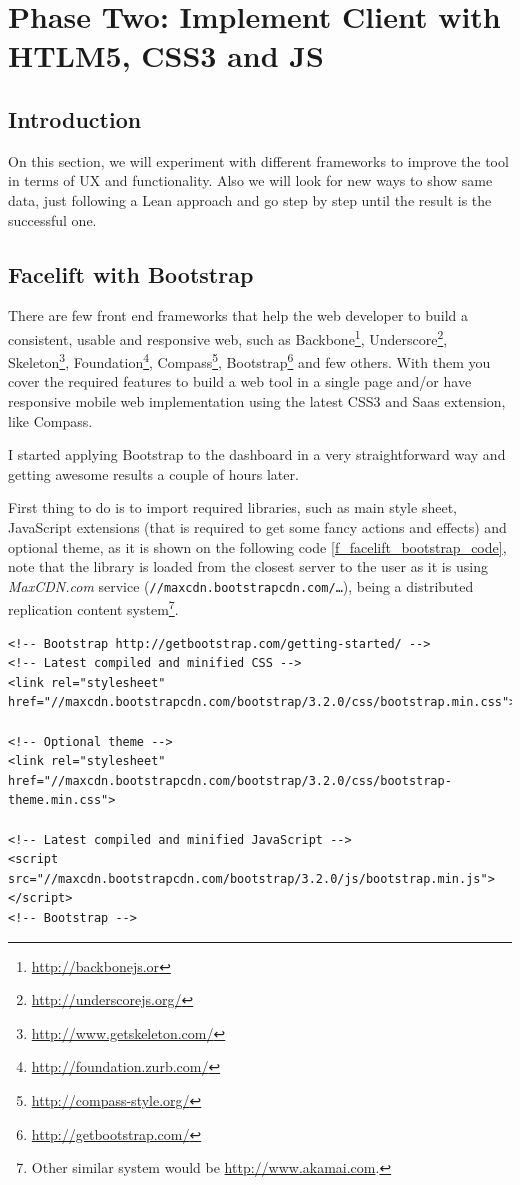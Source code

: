 \part{Phase Two: Implement Client with HTLM5, CSS3 and JS}

\chapter*{Introduction}
\label{c_phasetwo}
On this section, we will experiment with different frameworks to improve the
tool in terms of UX and functionality. Also we will look for new ways to show
same data, just following a Lean approach and go step by step until the result
is the successful one.


\chapter{Facelift with Bootstrap}
There are few front end frameworks that help the web developer to build a
consistent, usable and responsive web, such as
Backbone\footnote{\url{http://backbonejs.or}}, 
Underscore\footnote{\url{http://underscorejs.org/}},
Skeleton\footnote{\url{http://www.getskeleton.com/}},
Foundation\footnote{\url{http://foundation.zurb.com/}},
Compass\footnote{\url{http://compass-style.org/}},
Bootstrap\footnote{\url{http://getbootstrap.com/}} and few others. With them
you cover the required features to build a web tool in a
single page and/or have responsive mobile web implementation using the latest
CSS3 and Saas extension, like Compass.

I started applying Bootstrap to the dashboard in a very straightforward way and
getting awesome results a couple of hours later.

First thing to do is to import required libraries, such as main style sheet,
JavaScript extensions (that is required to get some fancy actions and effects)
and optional theme, as it is shown on the following code
\ref{f_facelift_bootstrap_code}, note that the library is loaded from the
closest server to the user as it is using \emph{MaxCDN.com} service
(\texttt{//maxcdn.bootstrapcdn.com/\ldots}), being a distributed replication
content system\footnote{Other similar system would be
\url{http://www.akamai.com}.}.

\begin{lstlisting}[style=html,breaklines=true,caption=Bootstrap\
required\ libraries,label=f_facelift_bootstrap_code]
<!-- Bootstrap http://getbootstrap.com/getting-started/ --> 
<!-- Latest compiled and minified CSS --> 
<link rel="stylesheet" href="//maxcdn.bootstrapcdn.com/bootstrap/3.2.0/css/bootstrap.min.css">

<!-- Optional theme -->
<link rel="stylesheet" href="//maxcdn.bootstrapcdn.com/bootstrap/3.2.0/css/bootstrap-theme.min.css">

<!-- Latest compiled and minified JavaScript -->
<script src="//maxcdn.bootstrapcdn.com/bootstrap/3.2.0/js/bootstrap.min.js"></script>
<!-- Bootstrap -->
\end{lstlisting} 

